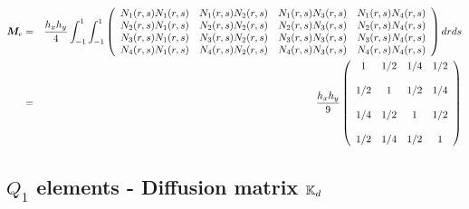\begin{eqnarray}
{\bm M}_e 
&=&   \frac{h_xh_y}{4} \int_{-1}^1 \int_{-1}^{1}
\left(
\begin{array}{cccc}
N_1(r,s)N_1(r,s) &  N_1(r,s)N_2(r,s) &  N_1(r,s)N_3(r,s) & N_1(r,s)N_4(r,s) \\
N_2(r,s)N_1(r,s) &  N_2(r,s)N_2(r,s) &  N_2(r,s)N_3(r,s) & N_2(r,s)N_4(r,s) \\
N_3(r,s)N_1(r,s) &  N_3(r,s)N_2(r,s) &  N_3(r,s)N_3(r,s) & N_3(r,s)N_4(r,s) \\
N_4(r,s)N_1(r,s) &  N_4(r,s)N_2(r,s) &  N_4(r,s)N_3(r,s) & N_4(r,s)N_4(r,s) 
\end{array}
\right)
dr ds\nonumber\\
&=&
\frac{h_x h_y}{9}
\left(
\begin{array}{cccc}
1 & 1/2 & 1/4 & 1/2 \\ \\ 
1/2 & 1   & 1/2 & 1/4 \\ \\
1/4 & 1/2 & 1 & 1/2 \\ \\
1/2 & 1/4 & 1/2 & 1  
\end{array}
\right)
\end{eqnarray}

\subsection{$Q_1$ elements - Diffusion matrix ${\mathbb{K}}_d$}

